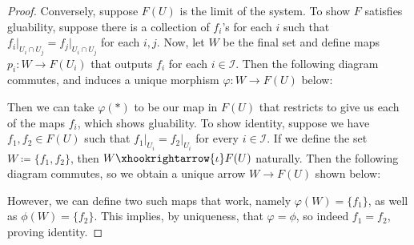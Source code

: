 \documentclass{article}
\newcommand{\fI}{\mathscr{I}}
\DeclareMathOperator{\res}{\mathrm{res}}
\begin{document}
\begin{proof}
   \vspace{\baselineskip}
    \noindent Conversely, suppose $F(U)$ is the limit of the system. To show $F$ satisfies gluability, suppose there is a collection of $f_i$'s for each $i$ such that $f_i\vert_{U_i \cap U_j}=f_j\vert_{U_i \cap U_j}$ for each $i,j$. Now, let $W$ be the final set and define maps $p_i:W\to F(U_i)$ that outputs $f_i$ for each $i\in \fI$. Then the following diagram commutes, and induces a unique morphism $\varphi:W\to F(U)$ below:
   \begin{center}
   \end{center}
   Then we can take $\varphi(\ast)$ to be our map in $F(U)$ that restricts to give us each of the maps $f_i$, which shows gluability. To show identity, suppose we have $f_1,f_2\in F(U)$ such that $f_1\vert_{U_i}=f_2\vert_{U_i}$ for every $i\in \fI$. If we define the set $W\coloneqq \{f_1,f_2\}$, then $W\xhookrightarrow{\iota} F(U)$ naturally. Then the following diagram commutes, so we obtain a unique arrow $W\to F(U)$ shown below:
   \begin{center}
   \end{center}
   However, we can define two such maps that work, namely $\varphi(W)=\{f_1\}$, as well as $\phi(W)=\{f_2\}$. This implies, by uniqueness, that $\varphi=\phi$, so indeed $f_1=f_2$, proving identity.
\end{proof}
\end{document}

